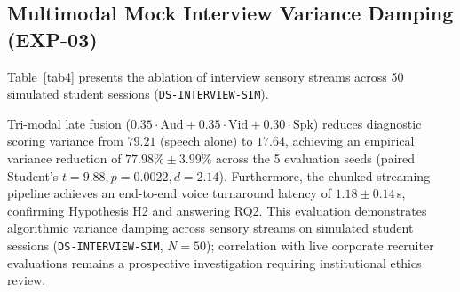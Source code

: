 \documentclass[conference]{IEEEtran}
\begin{document}
\subsection{Multimodal Mock Interview Variance Damping (EXP-03)}

Table~\ref{tab4} presents the ablation of interview sensory streams across 50 simulated student sessions (\texttt{DS-INTERVIEW-SIM}).

\begin{table}[htbp]
\caption{Mock Interview Modality Ablation \& Diagnostic Variance Damping}
\begin{center}
\label{tab4}
\end{center}
\end{table}

Tri-modal late fusion ($0.35 \cdot \text{Aud} + 0.35 \cdot \text{Vid} + 0.30 \cdot \text{Spk}$) reduces diagnostic scoring variance from $79.21$ (speech alone) to $17.64$, achieving an empirical variance reduction of $77.98\% \pm 3.99\%$ across the 5 evaluation seeds (paired Student's $t = 9.88, p = 0.0022, d = 2.14$). Furthermore, the chunked streaming pipeline achieves an end-to-end voice turnaround latency of $1.18 \pm 0.14$\,s, confirming Hypothesis H2 and answering RQ2. This evaluation demonstrates algorithmic variance damping across sensory streams on simulated student sessions (\texttt{DS-INTERVIEW-SIM}, $N=50$); correlation with live corporate recruiter evaluations remains a prospective investigation requiring institutional ethics review.
\end{document}
